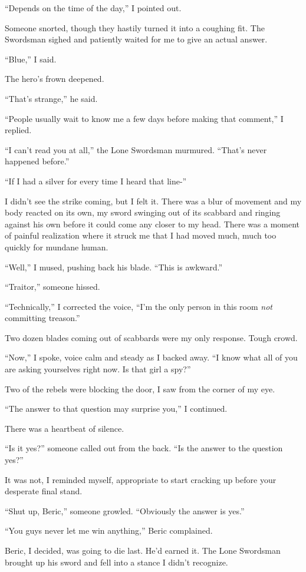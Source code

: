 \documentclass[12pt, openany]{book}
\begin{document}
“Depends on the time of the day,” I pointed out.

Someone snorted, though they hastily turned it into a coughing fit. The Swordsman sighed and patiently waited for me to give an actual answer.

“Blue,” I said.

The hero’s frown deepened.

“That’s strange,” he said.

“People usually wait to know me a few days before making that comment,” I replied.

“I can’t read you at all,” the Lone Swordsman murmured. “That’s never happened before.”

“If I had a silver for every time I heard that line-”

I didn’t see the strike coming, but I felt it. There was a blur of movement and my body reacted on its own, my sword swinging out of its scabbard and ringing against his own before it could come any closer to my head. There was a moment of painful realization where it struck me that I had moved much, much too quickly for mundane human.

“Well,” I mused, pushing back his blade. “This is awkward.”

“Traitor,” someone hissed.

“Technically,” I corrected the voice, “I’m the only person in this room \textit{not} committing treason.”

Two dozen blades coming out of scabbards were my only response. Tough crowd.

“Now,” I spoke, voice calm and steady as I backed away. “I know what all of you are asking yourselves right now. Is that girl a spy?”

Two of the rebels were blocking the door, I saw from the corner of my eye.

“The answer to that question may surprise you,” I continued.

There was a heartbeat of silence.

“Is it yes?” someone called out from the back. “Is the answer to the question yes?”

It was not, I reminded myself, appropriate to start cracking up before your desperate final stand.

“Shut up, Beric,” someone growled. “Obviously the answer is yes.”

“You guys never let me win anything,” Beric complained.

Beric, I decided, was going to die last. He’d earned it. The Lone Swordsman brought up his sword and fell into a stance I didn’t recognize.
\end{document}
